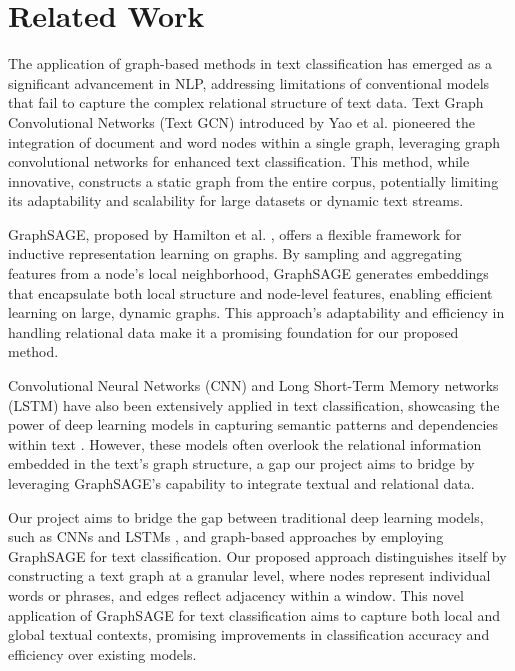 \documentclass{article}
\begin{document}
\section{Related Work}

The application of graph-based methods in text classification has emerged as a significant advancement in NLP, addressing limitations of conventional models that fail to capture the complex relational structure of text data. Text Graph Convolutional Networks (Text GCN) introduced by Yao et al. \cite{Yao2018GraphCN} pioneered the integration of document and word nodes within a single graph, leveraging graph convolutional networks for enhanced text classification. This method, while innovative, constructs a static graph from the entire corpus, potentially limiting its adaptability and scalability for large datasets or dynamic text streams.

GraphSAGE, proposed by Hamilton et al. \cite{Hamilton2017GraphSAGE}, offers a flexible framework for inductive representation learning on graphs. By sampling and aggregating features from a node's local neighborhood, GraphSAGE generates embeddings that encapsulate both local structure and node-level features, enabling efficient learning on large, dynamic graphs. This approach's adaptability and efficiency in handling relational data make it a promising foundation for our proposed method.

Convolutional Neural Networks (CNN) and Long Short-Term Memory networks (LSTM) have also been extensively applied in text classification, showcasing the power of deep learning models in capturing semantic patterns and dependencies within text \cite{Kim2014CNN, Liu2016RNN}. However, these models often overlook the relational information embedded in the text's graph structure, a gap our project aims to bridge by leveraging GraphSAGE's capability to integrate textual and relational data.

Our project aims to bridge the gap between traditional deep learning models, such as CNNs \cite{Kim2014CNN} and LSTMs \cite{Liu2016RNN}, and graph-based approaches by employing GraphSAGE for text classification. Our proposed approach distinguishes itself by constructing a text graph at a granular level, where nodes represent individual words or phrases, and edges reflect adjacency within a window. This novel application of GraphSAGE for text classification aims to capture both local and global textual contexts, promising improvements in classification accuracy and efficiency over existing models.
\end{document}
